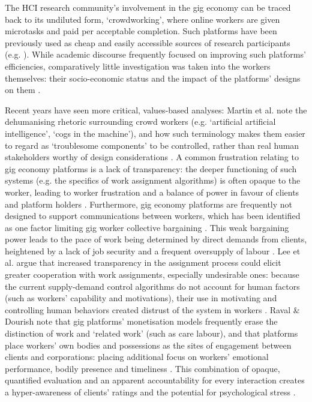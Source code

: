 The HCI research community's involvement in the gig economy can be traced back to its undiluted form, `crowdworking', where online workers are given microtasks and paid per acceptable completion. Such platforms have been previously used as cheap and easily accessible sources of research participants (e.g. \cite{mason2012conducting, mcnaney2016, Othman2017}). While academic discourse frequently focused on improving such platforms' efficiencies, comparatively little investigation was taken into the workers themselves: their socio-economic status and the impact of the platforms' designs on them \cite{Jacques2019, Irani2013}.

Recent years have seen more critical, values-based analyses: Martin et al. note the dehumanising rhetoric surrounding crowd workers (e.g. `artificial artificial intelligence', `cogs in the machine'), and how such terminology makes them easier to regard as `troublesome components' to be controlled, rather than real human stakeholders worthy of design considerations \cite{martin2016}. A common frustration relating to gig economy platforms is a lack of transparency: the deeper functioning of such systems (e.g. the specifics of work assignment algorithms) is often opaque to the worker, leading to worker frustration and a balance of power in favour of clients and platform holders \cite{martin2016}. Furthermore, gig economy platforms are frequently not designed to support communications between workers, which has been identified as one factor limiting gig worker collective bargaining \cite{Hara2018}. This weak bargaining power leads to the pace of work being determined by direct demands from clients, heightened by a lack of job security and a frequent oversupply of labour \cite{Wood2019}. Lee et al. argue that increased transparency in the assignment process could elicit greater cooperation with work assignments, especially undesirable ones: because the current supply-demand control algorithms do not account for human factors (such as workers' capability and motivations), their use in motivating and controlling human behaviors created distrust of the system in workers \cite{lee2015}. Raval \& Dourish note that gig platforms' monetisation models frequently erase the distinction of work and `related work' (such as care labour), and that platforms place workers' own bodies and possessions as the sites of engagement between clients and corporations: placing additional focus on workers' emotional performance, bodily presence and timeliness \cite{raval2016}. This combination of opaque, quantified evaluation and an apparent accountability for every interaction creates a hyper-awareness of clients' ratings and the potential for psychological stress \cite{lee2015}.

